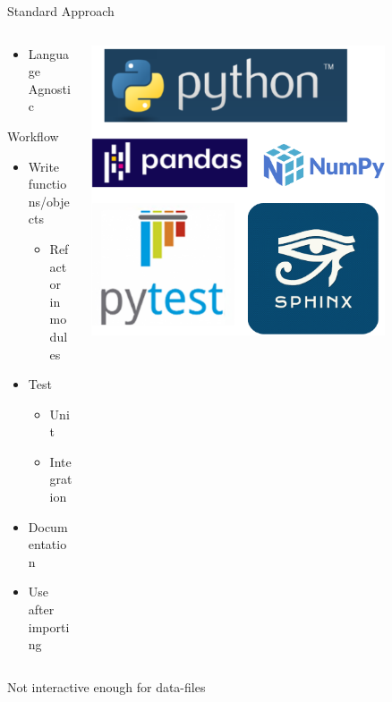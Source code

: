 \documentclass[bigger,unknownkeysallowed,aspectratio=169,red,colorblocks]{beamer}
\begin{document}
\begin{frame}[label={sec:org3ff4a84}]{Standard Approach}
\begin{columns}
\begin{column}{0.5\columnwidth}
\begin{itemize}
\item Language Agnostic
\end{itemize}
\begin{block}{Workflow}
\begin{itemize}
\item Write functions/objects
\begin{itemize}
\item Refactor in modules
\end{itemize}
\item Test
\begin{itemize}
\item Unit
\item Integration
\end{itemize}
\item Documentation
\item Use after importing
\end{itemize}
\end{block}
\end{column}

\begin{column}{0.5\columnwidth}
\begin{center}
\includegraphics[width=0.8\textwidth]{images/Standard_Approach/2020-09-20_04-19-58_screenshot.png}
\end{center}
\end{column}
\end{columns}

\vspace{\fill}

\alert{Not interactive enough for data-files}
\end{frame}
\end{document}
